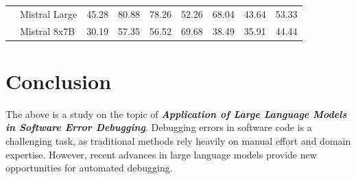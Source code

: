 \documentclass[a4paper,oneside]{book}
\begin{document}
\begin{table}[H]
{\begin{tabular}{|l|l|c|c|c|c|c|c|c|}
                                                 & Mistral Large & 45.28                      & 80.88                        & 78.26                        & 52.26                           & 68.04                       & 43.64                      & 53.33                           \\ \cline{2-9}
                                                 & Mistral 8x7B  & 30.19                      & 57.35                        & 56.52                        & 69.68                           & 38.49                       & 35.91                      & 44.44                           \\ \hline
        \end{tabular}%
    }
\end{table}

\chapter{Conclusion}
The above is a study on the topic of \textbf{\textit{Application of Large Language Models in Software Error Debugging}}. Debugging errors in software code is a challenging task, as traditional methods rely heavily on manual effort and domain expertise. However, recent advances in large language models provide new opportunities for automated debugging.

\newpage
\appendix
\end{document}
